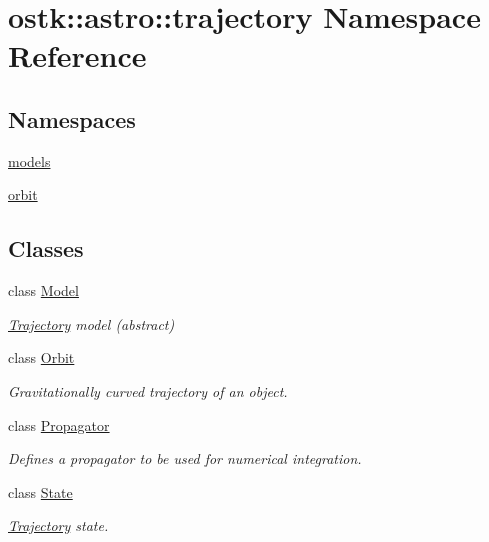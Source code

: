 \hypertarget{namespaceostk_1_1astro_1_1trajectory}{}\section{ostk\+:\+:astro\+:\+:trajectory Namespace Reference}
\label{namespaceostk_1_1astro_1_1trajectory}
\subsection*{Namespaces}
\begin{DoxyCompactItemize}
\item 
 \hyperlink{namespaceostk_1_1astro_1_1trajectory_1_1models}{models}
\item 
 \hyperlink{namespaceostk_1_1astro_1_1trajectory_1_1orbit}{orbit}
\end{DoxyCompactItemize}
\subsection*{Classes}
\begin{DoxyCompactItemize}
\item 
class \hyperlink{classostk_1_1astro_1_1trajectory_1_1_model}{Model}
\begin{DoxyCompactList}\small\item\em \hyperlink{classostk_1_1astro_1_1_trajectory}{Trajectory} model (abstract) \end{DoxyCompactList}\item 
class \hyperlink{classostk_1_1astro_1_1trajectory_1_1_orbit}{Orbit}
\begin{DoxyCompactList}\small\item\em Gravitationally curved trajectory of an object. \end{DoxyCompactList}\item 
class \hyperlink{classostk_1_1astro_1_1trajectory_1_1_propagator}{Propagator}
\begin{DoxyCompactList}\small\item\em Defines a propagator to be used for numerical integration. \end{DoxyCompactList}\item 
class \hyperlink{classostk_1_1astro_1_1trajectory_1_1_state}{State}
\begin{DoxyCompactList}\small\item\em \hyperlink{classostk_1_1astro_1_1_trajectory}{Trajectory} state. \end{DoxyCompactList}\end{DoxyCompactItemize}
